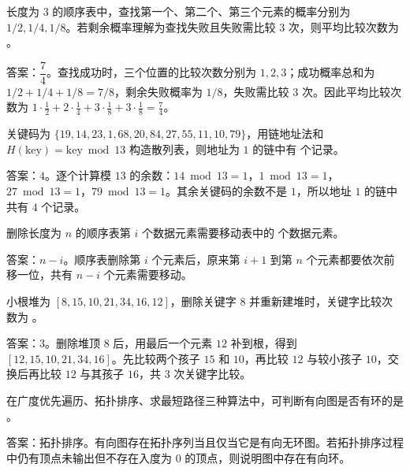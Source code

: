 \begin{question}
长度为 $3$ 的顺序表中，查找第一个、第二个、第三个元素的概率分别为 $1/2,1/4,1/8$。若剩余概率理解为查找失败且失败需比较 $3$ 次，则平均比较次数为 \blank。
\begin{solution}
答案：$\dfrac{7}{4}$。查找成功时，三个位置的比较次数分别为 $1,2,3$；成功概率总和为 $1/2+1/4+1/8=7/8$，剩余失败概率为 $1/8$，失败需比较 $3$ 次。因此平均比较次数为 $1\cdot\frac12+2\cdot\frac14+3\cdot\frac18+3\cdot\frac18=\frac74$。
\end{solution}
\end{question}

\begin{question}
关键码为 $\{19,14,23,1,68,20,84,27,55,11,10,79\}$，用链地址法和 $H(\mathrm{key})=\mathrm{key}\bmod 13$ 构造散列表，则地址为 $1$ 的链中有 \blank 个记录。
\begin{solution}
答案：$4$。逐个计算模 $13$ 的余数：$14\bmod13=1$，$1\bmod13=1$，$27\bmod13=1$，$79\bmod13=1$。其余关键码的余数不是 $1$，所以地址 $1$ 的链中共有 $4$ 个记录。
\end{solution}
\end{question}

\begin{question}
删除长度为 $n$ 的顺序表第 $i$ 个数据元素需要移动表中的 \blank 个数据元素。
\begin{solution}
答案：$n-i$。顺序表删除第 $i$ 个元素后，原来第 $i+1$ 到第 $n$ 个元素都要依次前移一位，共有 $n-i$ 个元素需要移动。
\end{solution}
\end{question}

\begin{question}
小根堆为 $[8,15,10,21,34,16,12]$，删除关键字 $8$ 并重新建堆时，关键字比较次数为 \blank。
\begin{solution}
答案：$3$。删除堆顶 $8$ 后，用最后一个元素 $12$ 补到根，得到 $[12,15,10,21,34,16]$。先比较两个孩子 $15$ 和 $10$，再比较 $12$ 与较小孩子 $10$，交换后再比较 $12$ 与其孩子 $16$，共 $3$ 次关键字比较。
\end{solution}
\end{question}

\begin{question}
在广度优先遍历、拓扑排序、求最短路径三种算法中，可判断有向图是否有环的是 \blank。
\begin{solution}
答案：拓扑排序。有向图存在拓扑序列当且仅当它是有向无环图。若拓扑排序过程中仍有顶点未输出但不存在入度为 $0$ 的顶点，则说明图中存在有向环。
\end{solution}
\end{question}

